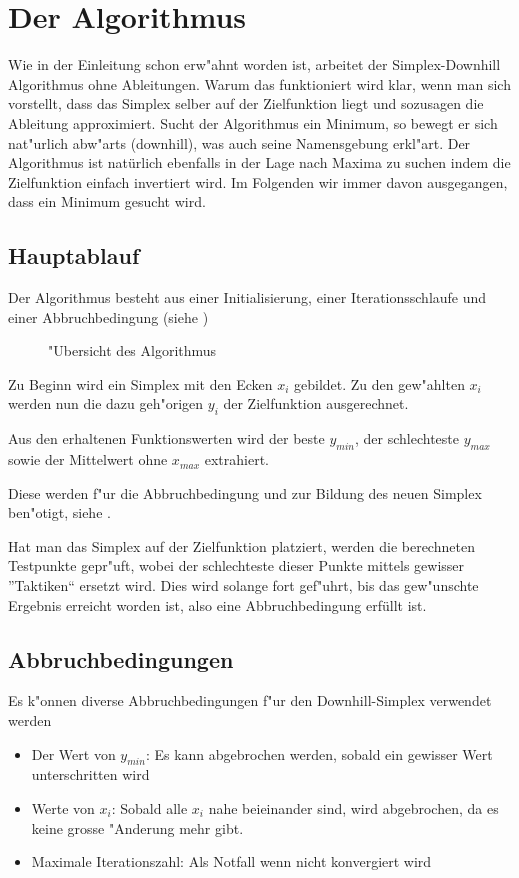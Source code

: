 \section{Der Algorithmus}

Wie in der Einleitung schon erw"ahnt worden ist, arbeitet der Simplex-Downhill Algorithmus ohne Ableitungen.
Warum das funktioniert wird klar, wenn man sich vorstellt, dass das Simplex selber auf der Zielfunktion liegt und sozusagen die Ableitung approximiert. Sucht der Algorithmus ein Minimum, so bewegt er sich nat"urlich abw"arts (downhill), was auch seine Namensgebung erkl"art.
Der Algorithmus ist natürlich ebenfalls in der Lage nach Maxima zu suchen indem die Zielfunktion einfach invertiert wird.
Im Folgenden wir immer davon ausgegangen, dass ein Minimum gesucht wird.

\subsection{Hauptablauf}
Der Algorithmus besteht aus einer Initialisierung, einer Iterationsschlaufe und einer Abbruchbedingung (siehe )

\begin{figure}[h]

\caption{"Ubersicht des Algorithmus}
\label{fig:downhillalgo1}
\end{figure}

Zu Beginn wird ein Simplex mit den Ecken $x_i$ gebildet.
Zu den gew"ahlten $x_i$ werden nun die dazu geh"origen $y_i$ der Zielfunktion ausgerechnet.

Aus den erhaltenen Funktionswerten wird der beste $y_{min}$, der schlechteste $y_{max}$ sowie der Mittelwert ohne $x_{max}$ extrahiert.

Diese werden f"ur die Abbruchbedingung  und zur Bildung des neuen Simplex ben"otigt, siehe .

Hat man das Simplex auf der Zielfunktion platziert, werden die berechneten Testpunkte gepr"uft, wobei der schlechteste dieser Punkte mittels gewisser ''Taktiken`` ersetzt wird. Dies wird solange fort gef"uhrt, bis das gew"unschte Ergebnis erreicht worden ist, also eine Abbruchbedingung erfüllt ist.

\subsection{Abbruchbedingungen}
\label{sec:downhillAbbruch}
Es k"onnen diverse Abbruchbedingungen f"ur den Downhill-Simplex verwendet werden
\begin{itemize}
\item Der Wert von $y_{min}$: Es kann abgebrochen werden, sobald ein gewisser Wert unterschritten wird
\item Werte von $x_i$: Sobald alle $x_i$ nahe beieinander sind, wird abgebrochen, da es keine grosse "Anderung mehr gibt.
\item Maximale Iterationszahl: Als Notfall wenn nicht konvergiert wird
\end{itemize}

